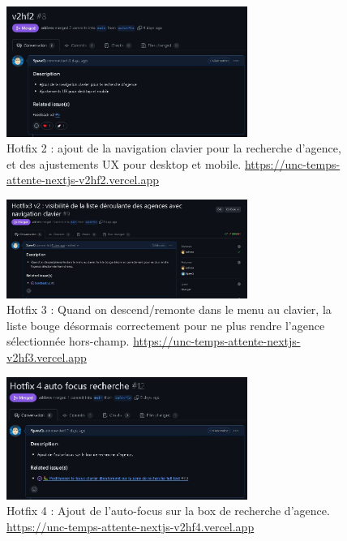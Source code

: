 \documentclass[12pt,a4paper]{report}
\begin{document}
\begin{figure}[h] %
    \centering
    \includegraphics[width=0.7\textwidth]{ressources_rapport/extrait_pr_8.JPG}
    \caption{Hotfix 2 : ajout de la navigation clavier pour la recherche d'agence, et des ajustements UX pour desktop et mobile. \href{https://unc-temps-attente-nextjs-v2hf2.vercel.app}{https://unc-temps-attente-nextjs-v2hf2.vercel.app}}
\end{figure}

\begin{figure}[h] %
    \centering
    \includegraphics[width=0.7\textwidth]{ressources_rapport/extrait_pr_9.JPG}
    \caption{Hotfix 3 : Quand on descend/remonte dans le menu au clavier, la liste bouge désormais correctement pour ne plus rendre l'agence sélectionnée hors-champ. \href{https://unc-temps-attente-nextjs-v2hf3.vercel.app}{https://unc-temps-attente-nextjs-v2hf3.vercel.app}}
\end{figure}

\begin{figure}[h] %
    \centering
    \includegraphics[width=0.7\textwidth]{ressources_rapport/extrait_pr_12.JPG}
    \caption{Hotfix 4 : Ajout de l'auto-focus sur la box de recherche d'agence. \href{https://unc-temps-attente-nextjs-v2hf4.vercel.app}{https://unc-temps-attente-nextjs-v2hf4.vercel.app}}
\end{figure}
\end{document}
